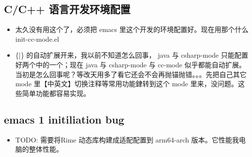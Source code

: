 \documentclass[9pt, b5paper]{article}
\begin{document}
\subsection{C/C++ 语言开发环境配置}
\label{sec-1-3}
\begin{itemize}
\item 太久没有用这个了，必须把 emacs 里这个开发的环境配置好。现在用那个什么 init-cc-mode.el
\item \{|\} 的自动扩展开来，我以前不知道怎么回事， java 与 csharp-mode 只能配置好两个中的一个；现在 java 与 csharp-mode 与 cc-mode 似乎都能自动扩展。当初是怎么回事呢？等改天用多了看它还会不会再抛锚抛错。。。先把自己其它 mode 里【中英文】切换注释等常用功能銉转到这个 mode 里来，没问题。这些简单功能都容易实现。
\end{itemize}
\subsection{{\bfseries\sffamily emacs} 1 initiliation bug}
\label{sec-1-4}
\begin{itemize}
\item TODO: 需要将Rime 动态库构建成适配配置到 arm64-arch 版本。它性能我电脑的整体性能。
\end{itemize}
\end{document}
